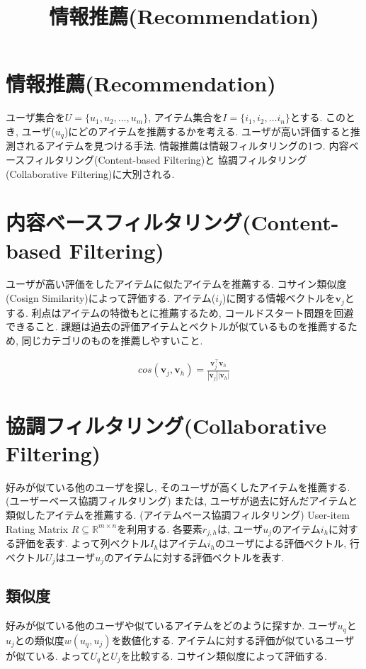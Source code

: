 \documentclass[dvipdfmx, 10pt]{jsarticle}
\title{\textbf{情報推薦(Recommendation)}}
\author{}
\date{}
\begin{document}
\maketitle

\section*{情報推薦(Recommendation)}
ユーザ集合を\(U = \{u_1, u_2, \dots, u_m\}\), アイテム集合を\(I = \{i_1, i_2, \dots i_n\}\)とする. 
このとき, ユーザ(\(u_q\))にどのアイテムを推薦するかを考える. ユーザが高い評価すると推測されるアイテムを見つける手法. 
情報推薦は情報フィルタリングの1つ. 内容ベースフィルタリング(Content-based Filtering)と
協調フィルタリング(Collaborative Filtering)に大別される. 

\section*{内容ベースフィルタリング(Content-based Filtering)}
ユーザが高い評価をしたアイテムに似たアイテムを推薦する. コサイン類似度(Cosign Similarity)によって評価する. 
アイテム(\(i_j\))に関する情報ベクトルを\(\mathbf{v}_j\)とする. 
利点はアイテムの特徴もとに推薦するため, コールドスタート問題を回避できること. 
課題は過去の評価アイテムとベクトルが似ているものを推薦するため, 同じカテゴリのものを推薦しやすいこと. 

\begin{align*}
    cos(\mathbf{v}_j, \mathbf{v}_h) 
    = \frac{\mathbf{v}_j^{\top} \mathbf{v}_h}{|\mathbf{v}_j| |\mathbf{v}_h|}
\end{align*}

\section*{協調フィルタリング(Collaborative Filtering)}
好みが似ている他のユーザを探し, そのユーザが高くしたアイテムを推薦する. (ユーザーベース協調フィルタリング)
または, ユーザが過去に好んだアイテムと類似したアイテムを推薦する. (アイテムベース協調フィルタリング)
User-item Rating Matrix \(R \subseteq \mathbb{R}^{m \times n}\)を利用する. 
各要素\(r_{j, h}\)は, ユーザ\(u_j\)のアイテム\(i_h\)に対する評価を表す. 
よって列ベクトル\(I_h\)はアイテム\(i_h\)のユーザによる評価ベクトル, 
行ベクトル\(U_j\)はユーザ\(u_j\)のアイテムに対する評価ベクトルを表す. 

\subsection*{類似度}
好みが似ている他のユーザや似ているアイテムをどのように探すか. ユーザ\(u_q\)と\(u_j\)との類似度\(w(u_q, u_j)\)を数値化する. 
アイテムに対する評価が似ているユーザが似ている. よって\(U_q\)と\(U_j\)を比較する. コサイン類似度によって評価する. 
\end{document}
